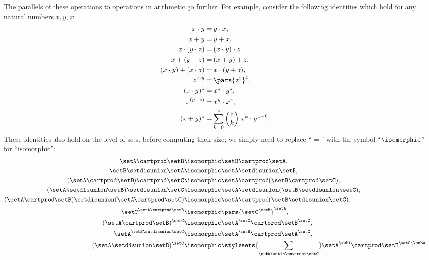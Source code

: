 The parallels of these operations to operations in arithmetic go further.
For example, consider the following identities which hold for any natural numbers $x, y, z$: 
\begin{align}
    x \cdot y & = y \cdot x,  \\ 
    x + y & = y + x, \\
    x \cdot (y \cdot z) & = (x \cdot y) \cdot z, \\
    x + (y + z) & = (x + y) + z, \\
    (x \cdot y) + (x \cdot z)  & = x \cdot (y + z), \\
    z^{x \cdot y}                    & = \pars{z^y}^x, \\
    (x \cdot y)^z &= x^z \cdot y^z, \\
    x^{(y + z)}           & = x^y \cdot x^z, \\
    (x + y)^z &= \sum_{k = 0}^z {{z}\choose{k}} \ x^k \cdot y^{z - k}. 
\end{align}
These identities also hold on the level of sets, before computing their size; we simply need to replace ``$=$'' with the symbol ``$\isomorphic$'' for ``isomorphic'':
\begin{align}
    \setA \cartprod \setB & \isomorphic \setB \cartprod \setA,  \\
    \setB \setdisunion \setA & \isomorphic \setA \setdisunion \setB,   \\
    (\setA \cartprod \setB) \cartprod \setC & \isomorphic \setA \cartprod (\setB \cartprod \setC), \\
    (\setA \setdisunion \setB) \setdisunion \setC & \isomorphic \setA \setdisunion (\setB \setdisunion \setC), \\
    (\setA \cartprod \setB) \setdisunion (\setA \cartprod \setC)  & \isomorphic \setA \cartprod (\setB \setdisunion \setC), \\
    \setC^{\setA \cartprod \setB}                    & \isomorphic \pars{\setC^\setB}^\setA, \\
    (\setA \cartprod \setB)^{\setC} & \isomorphic  \setA^\setC \cartprod \setB^\setC, \\
    \setA^{\setB \setdisunion \setC}           & \isomorphic \setA^\setB \cartprod \setA^\setC, \\
    (\setA \setdisunion \setB)^{\setC} & \isomorphic \stylesets{\sum_{\subA \setin \powerset \setC}} \setA^\subA \cartprod \setB^{\setC \backslash \subA} 
\end{align}


